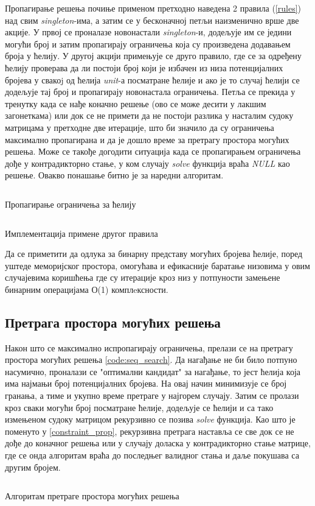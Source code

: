 Пропагирање решења почиње применом претходно наведена 2 правила (\ref{rules}) над свим \textit{singleton}-има, а затим се у бесконачној петљи наизменично врше две акције. У првој се проналазе новонастали \textit{singleton}-и, додељује им се једини могући број и затим пропагирају ограничења која су произведена додавањем броја у ћелију. У другој акцији примењује се друго правило, где се за одређену ћелију проверава да ли постоји број који је избачен из низа потенцијалних бројева у свакоj од ћелија \textit{unit}-а посматране ћелије и ако је то случај ћелији се додељује тај број и пропагирају новонастала ограничења. Петља се прекида у тренутку када се нађе коначно решење (ово се може десити у лакшим загонеткама) или док се не примети да не постоји разлика у насталим судоку матрицама у претходне две итерације, што би значило да су ограничења максимално пропагирана и да је дошло време за претрагу простора могућих решења. Може се такође догодити ситуација када се пропагирањем ограничења дође у контрадикторно стање, у ком случају \textit{solve} функција враћа \textit{NULL} као решење. Овакво понашање битно је за наредни алгоритам.

\begin{listing}[H]
\inputminted{c}{kodovi/rules_propagation.c}
\caption{Пропагирање ограничења за ћелију}
\label{code:rules_propagation}
\end{listing}

\begin{listing}[H]
\inputminted{c}{kodovi/common_forbidden.c}
\caption{Имплементација примене другог правила}
\label{code:common_forbidden}
\end{listing}

Да се приметити да одлука за бинарну представу могућих бројева ћелије, поред уштеде меморијског простора, омогућава и ефикасније баратање низовима у овим случајевима коришћења где су итерације кроз низ у потпуности замењене бинарним операцијама О(1) комплeксности.

\subsection{Претрага простора могућих решења}

Након што се максимално испропагирају ограничења, прелази се на претрагу простора могућих решења \ref{code:seq_search}. Да нагађање не би било потпуно насумично, проналази се "оптимални кандидат" за нагађање, то јест ћелија која има најмањи број потенцијалних бројева. На овај начин минимизује се број гранања, а тиме и укупно време претраге у најгорем случају. Затим се пролази кроз сваки могући број посматране ћелије, додељује се ћелији и са тако измењеном судоку матрицом рекурзивно се позива \textit{solve} функција. Као што је поменуто у \ref{constraint_prop}, рекурзивна претрага наставља се све док се не дође до коначног решења или у случају доласка у контрадикторно стање матрице, где се онда алгоритам враћа до последњег валидног стања и даље покушава са другим бројем.

\begin{listing}[H]
\inputminted{c}{kodovi/seq_search.c}
\caption{Алгоритам претраге  простора могућих решења}
\label{code:seq_search}
\end{listing}